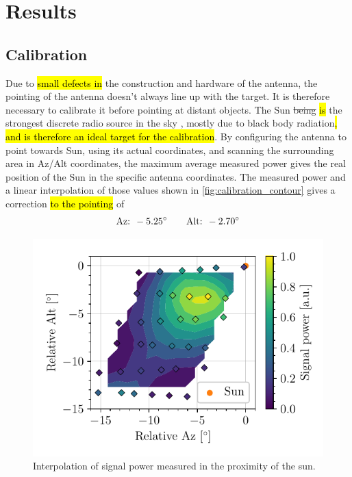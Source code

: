 \section{Results}
\subsection{Calibration}
Due to \hl{small defects in }the construction and hardware of the antenna, the pointing of the antenna doesn't always line up with the target. It is therefore necessary to calibrate it before pointing at distant objects. The Sun \st{being} \hl{is} the strongest discrete radio source in the sky \cite{burke_introduction_2013}, mostly due to black body radiation\hl{, and is therefore an ideal target for the calibration}.
By configuring the antenna to point towards Sun, using its actual coordinates, and scanning the surrounding area in Az/Alt coordinates, the maximum average measured power gives the real position of the Sun in the specific antenna coordinates. The measured power and a linear interpolation of those values shown in \autoref{fig:calibration_contour} gives a correction \hl{to the pointing} of
\begin{equation}
    \textrm{Az: } -5.25^\circ \qquad \textrm{Alt: } -2.70^\circ \\
\end{equation}
\begin{figure}[htbp]
    \centering
    \includegraphics[scale=1]{figures/calibration_contour.pdf}
    \caption{Interpolation of signal power measured in the proximity of the sun. }
    \label{fig:calibration_contour}
\end{figure}

